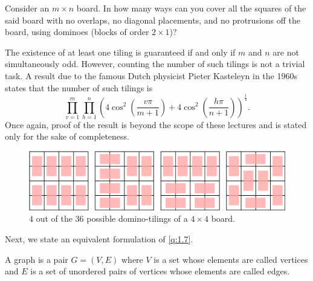 \begin{question}
	\label{q:1.7}
Consider an $m\times n$ board. In how many ways can you cover all the squares of the said board with no overlaps, no diagonal placements, and no protrusions off the board, using dominoes (blocks of order $2\times 1$)?
\end{question}

The existence of at least one tiling is guaranteed if and only if $m$ and $n$ are not simultaneously odd. However, counting the number of such tilings is not a trivial task. A result due to the famous Dutch physicist Pieter Kasteleyn in the 1960s states that the number of such tilings is
\[
	\prod_{v=1}^{m}\prod_{h=1}^{n}\left( 4\cos^2\left( \frac{v\pi}{m+1} \right) +4\cos^2\left( \frac{h\pi}{n+1} \right)  \right)^{\frac{1}{4}}.
	\label{KFormula}
\]
Once again, proof of the result is beyond the scope of these lectures and is stated only for the sake of completeness.
\begin{figure}[H]
    \centering
    \includegraphics[scale=0.6]{Images/Figure1.jpg}
    \caption{$4$ out of the $36$ possible domino-tilings of a $4\times 4$ board.}
\end{figure}

Next, we state an equivalent formulation of \cref{q:1.7}.

\begin{definition}[Graph]
A graph is a pair $G=\left( V,E \right)$ where $V$ is a set whose elements are called vertices and $E$ is a set of unordered pairs of vertices whose elements are called edges.
\label{d:1.2}
\end{definition}

